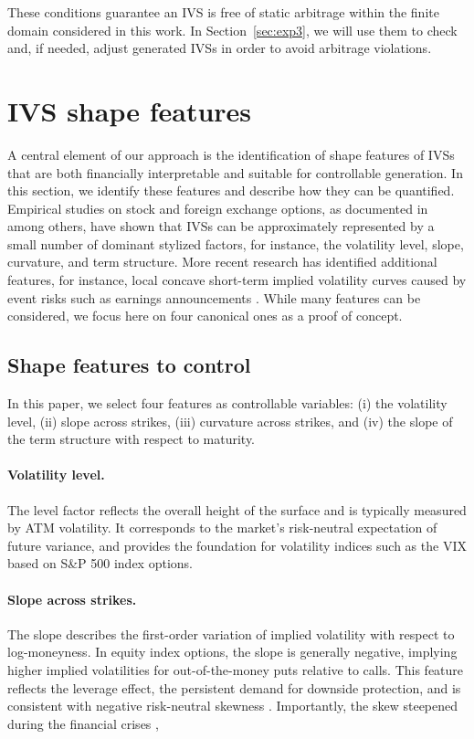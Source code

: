 \documentclass{article}
\begin{document}
These conditions guarantee  an IVS is free of static arbitrage within the finite domain considered in this work. In Section~\ref{sec:exp3}, we will use them to check and, 
if needed, adjust generated IVSs in order to avoid arbitrage violations.


\section{IVS shape features}
\label{sec:ShapeFeatures}
A central element of our approach is the identification of shape features of IVSs that are both financially interpretable and suitable for controllable generation. In this section, we identify these features  and describe how they can be quantified. Empirical studies on stock  and foreign exchange options, as documented in \citep{cont2002dynamics,franccois2022venturing,CHALAMANDARIS2011623}  among others,  have shown that  IVSs can be approximately represented by a small number of dominant stylized factors,  for instance,  the volatility level, slope, curvature, and term structure.  More recent research has identified additional features, for instance, local concave short-term implied volatility curves caused by event risks such as earnings announcements \citep{alexiou2025pricing}. While many features can be considered, we focus here on four canonical ones as a proof of concept.




\subsection{Shape features to control}
In this paper, we select four features as controllable variables: (i) the volatility level, (ii) slope across strikes, (iii) curvature across strikes, and (iv) the slope of the term structure with respect to maturity. 




\paragraph{Volatility level.}  
The level factor reflects the overall height of the surface and is typically measured by ATM volatility. It corresponds to the market's risk-neutral expectation of future variance,  and provides the foundation for volatility indices such as the VIX \citep{gatheral2006volatility} based on S\&P 500 index options. 

\paragraph{Slope across strikes.}  
The slope describes the first-order variation of implied volatility with respect to log-moneyness. In equity index options, the slope is generally negative, implying higher implied volatilities for out-of-the-money puts relative to calls. This feature reflects the leverage effect, the persistent demand for downside protection, and is consistent with negative risk-neutral skewness \citep{bollen2004does}. Importantly, the skew steepened during the financial crises \citep{constantinides2015supply},
\end{document}
